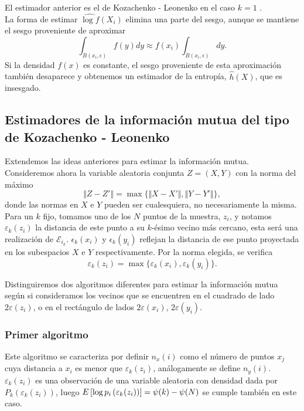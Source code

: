 \documentclass[12pt,a4paper]{report} %
\let\mathbb\relax
\theoremstyle{definition}
\begin{document}
El estimador anterior es el de Kozachenko - Leonenko en el caso $k=1$ \cite{kozachenko-leonenko}.\\

La forma de estimar $\widehat{\log f} (X_i)$ elimina una parte del sesgo, aunque se mantiene el sesgo proveniente de aproximar\[\int_{B(x_i,\epsilon)}f(y)dy\approx f(x_i) \int_{B(x_i,\epsilon)}dy.\] Si la densidad $f(x)$ es constante, el sesgo proveniente de esta aproximación también desaparece y obtenemos un estimador de la entropía, $\widehat{h}(X)$, que es insesgado.

\subsection{Estimadores de la información mutua del tipo de Kozachenko - Leonenko}

Extendemos las ideas anteriores para estimar la información mutua.\\

Consideremos ahora la variable aleatoria conjunta $Z=(X,Y)$ con la norma del máximo\[ \Vert Z - Z' \Vert = \max \{\Vert X-X' \Vert, \Vert Y-Y'\Vert\},\] donde las normas en $X$ e $Y$ pueden ser cualesquiera, no necesariamente la misma. \\

Para un $k$ fijo, tomamos uno de los $N$ puntos de la muestra, $z_i$, y notamos $\varepsilon_k(z_i)$ la distancia de este punto a su $k$-ésimo vecino más cercano, esta será una realización de $\mathcal{E}_{i_k}$. $\epsilon_k(x_i)$ y $\epsilon_k(y_i)$ reflejan la distancia de ese punto proyectada en los subespacios $X$ e $Y$ respectivamente. Por la norma elegida, se verifica \[\varepsilon_k(z_i) = \max \{\varepsilon_k(x_i), \varepsilon_k(y_i)\}.\]

Distinguiremos dos algoritmos diferentes para estimar la información mutua según si consideramos los vecinos que se encuentren en el cuadrado de lado $2\varepsilon(z_i)$, o en el rectángulo de lados $2\varepsilon(x_i)$, $2\varepsilon(y_i)$. 

\subsubsection{Primer algoritmo}

Este algoritmo se caracteriza por definir $n_x(i)$ como el número de puntos $x_j$ cuya distancia a $x_i$ es menor que $\varepsilon_k(z_i)$, análogamente se define $n_y(i)$. $\varepsilon_k(z_i)$ es una observación de una variable aleatoria con densidad dada por $P_k(\varepsilon_k(z_i))$, luego $\mathbb{E}\left[\log p_i\left(\varepsilon_k(z_i)\right)\right] = \psi(k) - \psi(N)$ se cumple también en este caso.\\
\end{document}
